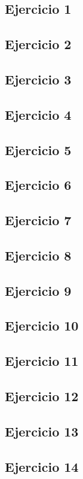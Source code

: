 

\subsection{Ejercicio 1}
	

\subsection{Ejercicio 2}
	

\subsection{Ejercicio 3}
	

\subsection{Ejercicio 4}
	

\subsection{Ejercicio 5}
	

\subsection{Ejercicio 6}
	

\subsection{Ejercicio 7}
	

\subsection{Ejercicio 8}
	

\subsection{Ejercicio 9}
	

\subsection{Ejercicio 10}
	

\subsection{Ejercicio 11}
	

\subsection{Ejercicio 12}
	

\subsection{Ejercicio 13}
	

\subsection{Ejercicio 14}
	
